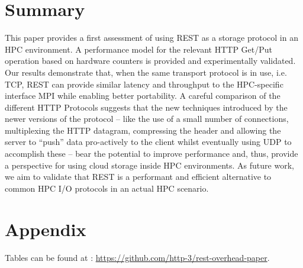 \documentclass[runningheads]{llncs}
\begin{document}
\section{Summary}

This paper provides a first assessment of using REST as a storage protocol in an HPC environment. A performance model for the relevant HTTP Get/Put operation based on hardware counters is provided and experimentally validated. Our results demonstrate that, when the same transport protocol is in use, i.e. TCP, REST can provide similar latency and throughput to the HPC-specific interface MPI while enabling better portability.
A careful comparison of the different HTTP Protocols suggests that the new techniques introduced by the newer versions of the protocol -- like the use of a small number of connections, multiplexing the HTTP datagram, compressing the header and allowing the server to “push” data pro-actively to the client whilst eventually using UDP to accomplish these -- bear the potential to improve performance and, thus, provide a perspective for using cloud storage inside HPC environments.
As future work, we aim to validate that REST is a performant and efficient alternative to common HPC I/O protocols in an actual HPC scenario.

\section{Appendix}

Tables can be found at : \href{https://github.com/http-3/rest-overhead-paper}{https://github.com/http-3/rest-overhead-paper}.




\nocite{*}
%
%
%





\end{document}
